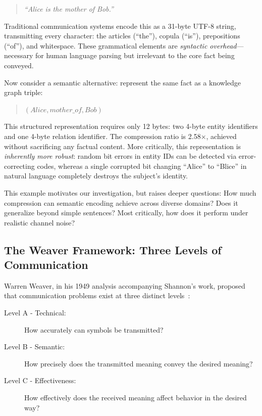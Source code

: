 \documentclass[conference]{IEEEtran}
\begin{document}
\begin{quote}
\textit{``Alice is the mother of Bob.''}
\end{quote}

Traditional communication systems encode this as a 31-byte UTF-8 string, 
transmitting every character: the articles (``the''), copula (``is''), 
prepositions (``of''), and whitespace. These grammatical elements are 
\textit{syntactic overhead}—necessary for human language parsing but 
irrelevant to the core fact being conveyed.

Now consider a semantic alternative: represent the same fact as a 
knowledge graph triple:

\begin{quote}
$(Alice, mother\_of, Bob)$
\end{quote}

This structured representation requires only 12 bytes: two 4-byte entity 
identifiers and one 4-byte relation identifier. The compression ratio 
is 2.58×, achieved without sacrificing any factual content. More 
critically, this representation is \textit{inherently more robust}: 
random bit errors in entity IDs can be detected via error-correcting 
codes, whereas a single corrupted bit changing ``Alice'' to ``Blice'' 
in natural language completely destroys the subject's identity.

This example motivates our investigation, but raises deeper questions: 
How much compression can semantic encoding achieve across diverse domains? 
Does it generalize beyond simple sentences? Most critically, how does 
it perform under realistic channel noise?

\subsection{The Weaver Framework: Three Levels of Communication}

Warren Weaver, in his 1949 analysis accompanying Shannon's work, proposed 
that communication problems exist at three distinct levels~\cite{Weaver1949}:

\begin{description}
\item[Level A - Technical:] How accurately can symbols be transmitted?
\item[Level B - Semantic:] How precisely does the transmitted meaning 
convey the desired meaning?
\item[Level C - Effectiveness:] How effectively does the received meaning 
affect behavior in the desired way?
\end{description}
\end{document}
